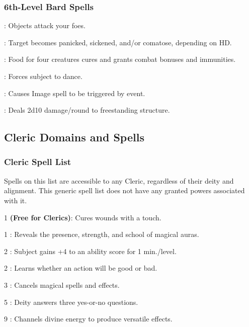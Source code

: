 \subsubsection{6th-Level Bard Spells}
\begin{list}{}{\leftmargin=1em}
\item {}: Objects attack your foes.
\item {}: Target becomes panicked, sickened, and/or comatose, depending on HD.
\item {}: Food for four creatures cures and grants combat bonuses and immunities.
\item {}: Forces subject to dance.
\item {}: Causes Image spell to be triggered by event.
\item {}: Deals 2d10 damage/round to freestanding structure.
\end{list}
\subsection{Cleric Domains and Spells}
\label{sec:ClericDomains}
\subsubsection{Cleric Spell List}
\label{Domain:General}
Spells on this list are accessible to any Cleric, regardless of their deity and alignment. This generic spell list does not have any granted powers associated with it.
\begin{list}{}{\leftmargin=1em}
  \item[1]  \textbf{(Free for Clerics)}: Cures wounds with a touch.
  \item[1] : Reveals the presence, strength, and school of magical auras.
  \item[2] : Subject gains +4 to an ability score for 1 min./level.
  \item[2] : Learns whether an action will be good or bad.
  \item[3] : Cancels magical spells and effects.
  \item[5] : Deity answers three yes-or-no questions.
  \item[9] : Channels divine energy to produce versatile effects.
\end{list}

